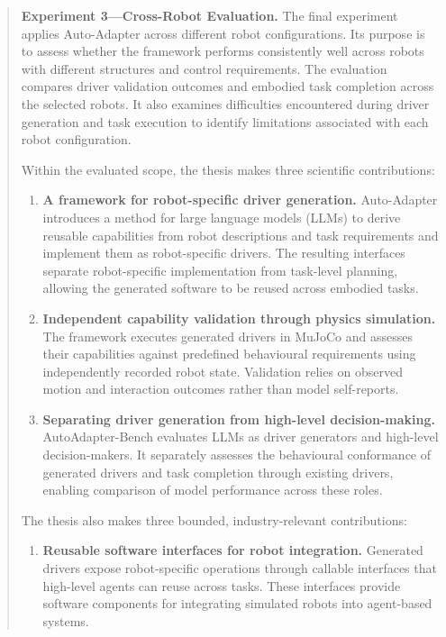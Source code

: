 \begin{abstract}
\textbf{Experiment 3---Cross-Robot Evaluation.} The final experiment applies
Auto-Adapter across different robot configurations. Its purpose is to assess
whether the framework performs consistently well across robots with different
structures and control requirements. The evaluation compares driver
validation outcomes and embodied task completion across the selected robots.
It also examines difficulties encountered during driver generation and task
execution to identify limitations associated with each robot configuration.


Within the evaluated scope, the thesis makes three scientific contributions:
\vspace{-\parskip}
\begin{enumerate}[leftmargin=*,labelsep=.8em,nosep]

  \item \textbf{A framework for robot-specific driver generation.}
  Auto-Adapter introduces a method for large language models (LLMs) to derive
  reusable capabilities from robot descriptions and task requirements and
  implement them as robot-specific drivers. The resulting interfaces separate
  robot-specific implementation from task-level planning, allowing the
  generated software to be reused across embodied tasks.

  \item \textbf{Independent capability validation through physics simulation.}
  The framework executes generated drivers in MuJoCo and assesses their
  capabilities against predefined behavioural requirements using independently
  recorded robot state. Validation relies on observed motion and interaction
  outcomes rather than model self-reports.

  \item \textbf{Separating driver generation from high-level decision-making.}
  AutoAdapter-Bench evaluates LLMs as driver generators and high-level
  decision-makers. It separately assesses the behavioural conformance of
  generated drivers and task completion through existing drivers, enabling
  comparison of model performance across these roles.

\end{enumerate}

The thesis also makes three bounded,
industry-relevant contributions:
\vspace{-\parskip}
\begin{enumerate}[leftmargin=*,labelsep=.8em,nosep]

  \item \textbf{Reusable software interfaces for robot integration.}
  Generated drivers expose robot-specific operations through callable
  interfaces that high-level agents can reuse across tasks. These interfaces
  provide software components for integrating simulated robots into
  agent-based systems.


\end{enumerate}
\end{abstract}
